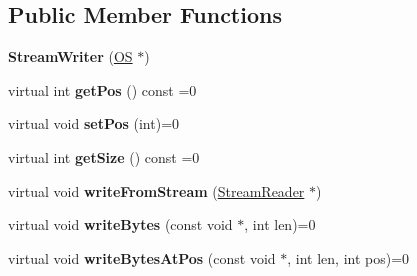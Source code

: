 \subsection*{Public Member Functions}
\begin{DoxyCompactItemize}
\item 
{\bfseries Stream\+Writer} (\hyperlink{class_object_script_1_1_o_s}{OS} $\ast$)\hypertarget{class_object_script_1_1_o_s_1_1_core_1_1_stream_writer_a6d223efc43e1c29b84ad01f43269cd50}{}\label{class_object_script_1_1_o_s_1_1_core_1_1_stream_writer_a6d223efc43e1c29b84ad01f43269cd50}

\item 
virtual int {\bfseries get\+Pos} () const  =0\hypertarget{class_object_script_1_1_o_s_1_1_core_1_1_stream_writer_a5cf632e74a20587211acee815b2ba684}{}\label{class_object_script_1_1_o_s_1_1_core_1_1_stream_writer_a5cf632e74a20587211acee815b2ba684}

\item 
virtual void {\bfseries set\+Pos} (int)=0\hypertarget{class_object_script_1_1_o_s_1_1_core_1_1_stream_writer_a67f7846da7065e4be39303f6d6502b6e}{}\label{class_object_script_1_1_o_s_1_1_core_1_1_stream_writer_a67f7846da7065e4be39303f6d6502b6e}

\item 
virtual int {\bfseries get\+Size} () const  =0\hypertarget{class_object_script_1_1_o_s_1_1_core_1_1_stream_writer_a441e66390ade9dde2d79fe8b5e1e110b}{}\label{class_object_script_1_1_o_s_1_1_core_1_1_stream_writer_a441e66390ade9dde2d79fe8b5e1e110b}

\item 
virtual void {\bfseries write\+From\+Stream} (\hyperlink{class_object_script_1_1_o_s_1_1_core_1_1_stream_reader}{Stream\+Reader} $\ast$)\hypertarget{class_object_script_1_1_o_s_1_1_core_1_1_stream_writer_adb1de32b8e803f2a438b5c1677a54704}{}\label{class_object_script_1_1_o_s_1_1_core_1_1_stream_writer_adb1de32b8e803f2a438b5c1677a54704}

\item 
virtual void {\bfseries write\+Bytes} (const void $\ast$, int len)=0\hypertarget{class_object_script_1_1_o_s_1_1_core_1_1_stream_writer_ae08db06a0aa75a7edc789343f8775138}{}\label{class_object_script_1_1_o_s_1_1_core_1_1_stream_writer_ae08db06a0aa75a7edc789343f8775138}

\item 
virtual void {\bfseries write\+Bytes\+At\+Pos} (const void $\ast$, int len, int pos)=0\hypertarget{class_object_script_1_1_o_s_1_1_core_1_1_stream_writer_a63e07fec4e2687d0f35064c145ffab71}{}\label{class_object_script_1_1_o_s_1_1_core_1_1_stream_writer_a63e07fec4e2687d0f35064c145ffab71}


\end{DoxyCompactItemize}
